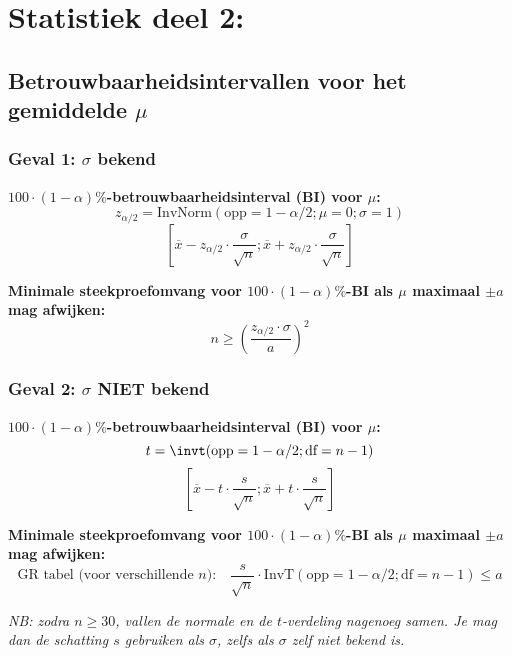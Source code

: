 \section*{Statistiek deel 2:}

\subsection*{Betrouwbaarheidsintervallen voor het gemiddelde $\mu$}
    \subsubsection*{Geval 1: $\sigma$ bekend}
        \textbf{\boldmath$100\cdot(1-\alpha)\%$-betrouwbaarheidsinterval (BI) voor \boldmath$\mu$:}
        \[
            z_{\alpha/2} = \text{InvNorm}(\text{opp}=1-\alpha/2; \mu=0; \sigma=1)
        \]
        \[
            [\overline{x} - z_{\alpha/2} \cdot \frac{\sigma}{\sqrt{n}}; \overline{x} + z_{\alpha/2} \cdot \frac{\sigma}{\sqrt{n}}]
        \]

        \textbf{Minimale steekproefomvang voor \boldmath$100\cdot(1-\alpha)\%$-BI als \boldmath$\mu$ maximaal \boldmath$\pm a$ mag afwijken:}
        \[
            n \ge \left( \frac{z_{\alpha/2} \cdot \sigma}{a} \right)^2
        \]

    \subsubsection*{Geval 2: $\sigma$ NIET bekend}
        \textbf{\boldmath$100\cdot(1-\alpha)\%$-betrouwbaarheidsinterval (BI) voor \boldmath$\mu$:}
        \[
            t = \invt(\text{opp}=1-\alpha/2; \text{df}=n-1)
        \]
        \[
            [\overline{x} - t \cdot \frac{s}{\sqrt{n}}; \overline{x} + t \cdot \frac{s}{\sqrt{n}}]
        \]

        \textbf{Minimale steekproefomvang voor $100\cdot(1-\alpha)\%$-BI als $\mu$ maximaal \boldmath$\pm a$ mag afwijken:}
        \[
            \text{GR tabel (voor verschillende $n$):} \quad \frac{s}{\sqrt{n}} \cdot \text{InvT}(\text{opp}=1-\alpha/2; \text{df}=n-1) \le a
        \]
    
    {\itshape NB: zodra $n \ge 30$, vallen de normale en de $t$-verdeling nagenoeg samen. Je mag dan de schatting $s$ gebruiken als $\sigma$, zelfs als $\sigma$ zelf niet bekend is.}

